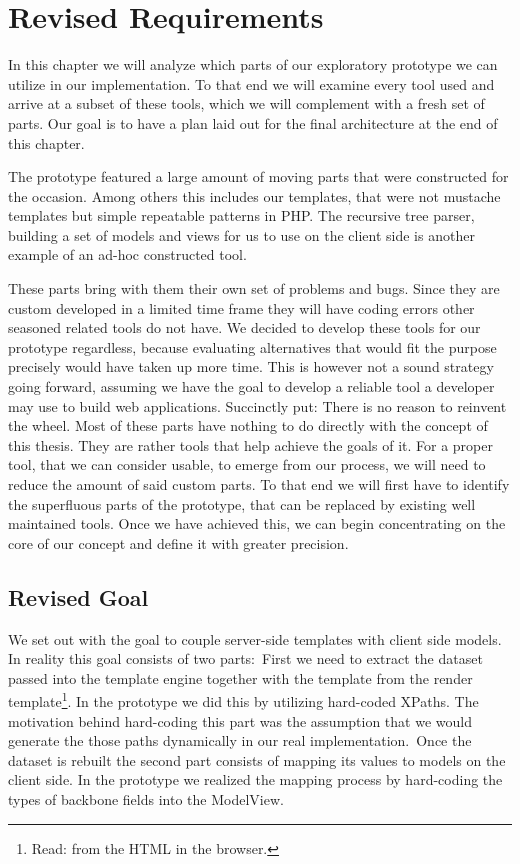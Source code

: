 \documentclass[thesis.tex]{subfiles}
\begin{document}
\chapter{Revised Requirements}
\label{chap:revised}
In this chapter we will analyze which parts of our exploratory prototype we can
utilize in our implementation. To that end we will examine every tool used and
arrive at a subset of these tools, which we will complement with a fresh set of
parts. Our goal is to have a plan laid out for the final architecture at the end
of this chapter.

The prototype featured a large amount of moving parts that were constructed for
the occasion. Among others this includes our templates, that were not mustache
templates but simple repeatable patterns in PHP. The recursive tree parser,
building a set of models and views for us to use on the client side is another
example of an ad-hoc constructed tool.

These parts bring with them their own set of problems and bugs.
Since they are custom developed in a limited time frame they will have coding
errors other seasoned related tools do not have.
We decided to develop these tools for our prototype regardless,
because evaluating alternatives that would fit the purpose precisely
would have taken up more time.
This is however not a sound strategy going forward, assuming we have the goal to
develop a reliable tool a developer may use to build web applications.
Succinctly put: There is no reason to reinvent the wheel.
Most of these parts have nothing to do directly with the concept of this thesis.
They are rather tools that help achieve the goals of it.
For a proper tool, that we can consider usable, to emerge from our process,
we will need to reduce the amount of said custom parts.
To that end we will first have to identify the superfluous parts of the
prototype, that can be replaced by existing well maintained tools. Once we have
achieved this, we can begin concentrating on the core of our concept and define
it with greater precision.

\section{Revised Goal}
\label{sec:revised-goal}
We set out with the goal to couple server-side templates with client side
models. In reality this goal consists of two parts:\
First we need to extract the dataset passed into the template engine together
with the template from the render template\footnote{Read: from the HTML in the browser.}.
In the prototype we did this by utilizing hard-coded XPaths. The motivation
behind hard-coding this part was the assumption that we would generate the those
paths dynamically in our real implementation.\
Once the dataset is rebuilt the second part consists of mapping its values
to models on the client side. In the prototype we realized the mapping process
by hard-coding the types of backbone fields into the ModelView.
\end{document}
